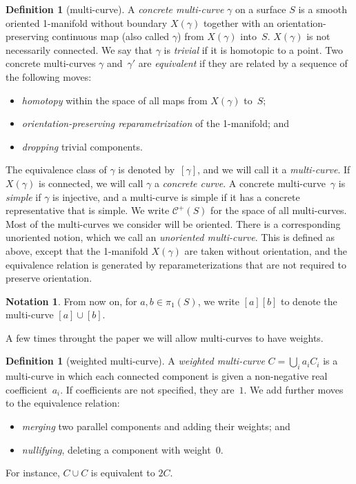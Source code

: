 \documentclass[11pt]{amsart}
\numberwithin{equation}{section}
\numberwithin{figure}{section}
\theoremstyle{definition}
\newtheorem{definition}[theorem]{Definition}
\newtheorem*{notation*}{Notation}
\theoremstyle{plain}
\newcommand{\Curves}{\mathcal{C}}
\begin{document}
\begin{definition}[multi-curve]\label{def:multi-curve}  
A \emph{concrete multi-curve} $\gamma$ on a surface $S$ is a smooth
oriented 1-manifold without boundary $X(\gamma)$ together with an orientation-preserving continuous map
(also called $\gamma$) from $X(\gamma)$
into~$S$. $X(\gamma)$ is not necessarily connected.
We say that $\gamma$ is \emph{trivial} if it is
homotopic to a point.
Two concrete multi-curves $\gamma$ and~$\gamma'$ are \emph{equivalent} if
they are related by a sequence of the following moves:
\begin{itemize}
    \item \emph{homotopy} within the space of all maps from $X(\gamma)$ to~$S$;
    \item \emph{orientation-preserving reparametrization} of the 1-manifold;
      and
    \item \emph{dropping} trivial components.
\end{itemize}
The equivalence class of $\gamma$ is denoted by~$[\gamma]$, and we will
call it a \emph{multi-curve}.
If $X(\gamma)$ is connected, we will call $\gamma$ a \emph{concrete curve}.
A concrete multi-curve~$\gamma$ is \emph{simple} if $\gamma$ is injective, and a multi-curve is simple if it has a concrete representative
that is simple.
We write $\Curves^+(S)$ for the space of all multi-curves.
Most of the multi-curves we consider will be oriented. There is a corresponding unoriented notion, which we call an \emph{unoriented multi-curve}. This is defined as above, except that the 1-manifold $X(\gamma)$ are taken without orientation, and the equivalence relation is generated by reparameterizations that are not required to preserve orientation.
\end{definition}


  \begin{notation*}
  From now on, for $a, b\in \pi_1(S)$, we write $[a][b]$ to denote the multi-curve $[a] \cup [b]$.
  \end{notation*} 

A few times throught the paper we will allow multi-curves to have weights.

\begin{definition}[weighted multi-curve]\label{def:weighted-multi-curve}
  A \emph{weighted multi-curve} $C=\bigcup_i a_i C_i$ is a multi-curve in
  which each connected component is given a non-negative real
  coefficient~$a_i$. If coefficients are not specified, they are~$1$.
  We add further moves to the equivalence
  relation:
  \begin{itemize}
  \item \emph{merging} two parallel components and
    adding their weights; and
  \item \emph{nullifying}, deleting a
    component with weight~$0$.
  \end{itemize}
  For
  instance, $C \cup C$ is equivalent to $2C$.
\end{definition}
\end{document}
